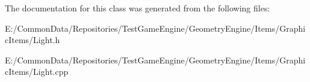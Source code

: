 The documentation for this class was generated from the following files\+:\begin{DoxyCompactItemize}
\item 
E\+:/\+Common\+Data/\+Repositories/\+Test\+Game\+Engine/\+Geometry\+Engine/\+Items/\+Graphic\+Items/Light.\+h\item 
E\+:/\+Common\+Data/\+Repositories/\+Test\+Game\+Engine/\+Geometry\+Engine/\+Items/\+Graphic\+Items/Light.\+cpp\end{DoxyCompactItemize}
